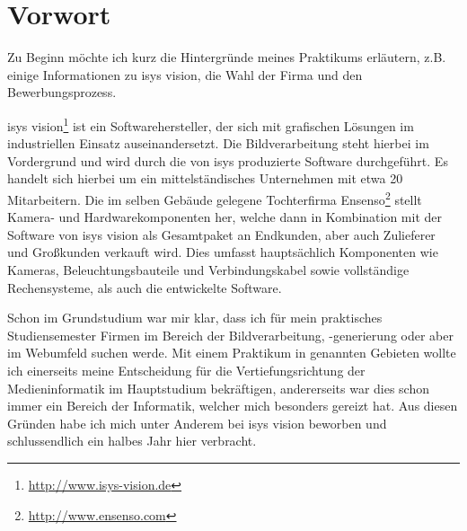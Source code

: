 \chapter{Vorwort}
\label{ch:0}

Zu Beginn möchte ich kurz die Hintergründe meines Praktikums erläutern,
z.B. einige Informationen zu isys vision, die Wahl der Firma und den Bewerbungsprozess.

isys vision\footnote{\url{http://www.isys-vision.de}} ist ein Softwarehersteller, der sich mit grafischen Lösungen im industriellen Einsatz auseinandersetzt.
Die Bildverarbeitung steht hierbei im Vordergrund und wird durch die von isys produzierte
Software durchgeführt. Es handelt sich hierbei um ein mittelständisches Unternehmen mit etwa 20 Mitarbeitern. Die im selben Gebäude gelegene Tochterfirma Ensenso\footnote{\url{http://www.ensenso.com}} stellt
Kamera- und Hardwarekomponenten her, welche dann in Kombination mit der Software von isys vision
als Gesamtpaket an Endkunden, aber auch Zulieferer und Großkunden verkauft wird. Dies umfasst
hauptsächlich Komponenten wie Kameras, Beleuchtungsbauteile und Verbindungskabel
sowie vollständige Rechensysteme, als auch die entwickelte Software.

Schon im Grundstudium war mir klar, dass ich für mein praktisches Studiensemester
Firmen im Bereich der Bildverarbeitung, -generierung oder aber im Webumfeld suchen
werde. Mit einem Praktikum in genannten Gebieten wollte ich einerseits meine Entscheidung
für die Vertiefungsrichtung der Medieninformatik im Hauptstudium bekräftigen, andererseits
war dies schon immer ein Bereich der Informatik, welcher mich besonders gereizt
hat. Aus diesen Gründen habe ich mich unter Anderem bei isys vision beworben und
schlussendlich ein halbes Jahr hier verbracht.

